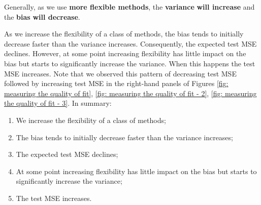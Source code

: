 \documentclass[a4paper]{article}
\newcommand{\definition}[1]{\textcolor{Red3}{\textbf{#1}}\index{#1}}
\newcommand{\highspace}{\vspace{1.2em}\noindent}
\begin{document}
    \noindent
    Generally, as we use \textbf{more flexible methods}, the \definition{variance} \textbf{will increase} and the \definition{bias} \textbf{will decrease}.

    \highspace
    As we increase the flexibility of a class of methods, the bias tends to initially decrease faster than the variance increases. Consequently, the expected test MSE declines. However, at some point increasing flexibility has little impact on the bias but starts to significantly increase the variance. When this happens the test MSE increases. Note that we observed this pattern of decreasing test MSE followed by increasing test MSE in the right-hand panels of Figures \ref{fig: measuring the quality of fit}, \ref{fig: measuring the quality of fit - 2}, \ref{fig: measuring the quality of fit - 3}. In summary:
    \begin{enumerate}
        \item We increase the flexibility of a class of methods;
        \item The bias tends to initially decrease faster than the variance increases;
        \item The expected test MSE declines;
        \item At some point increasing flexibility has little impact on the bias but starts to significantly increase the variance;
        \item The test MSE increases.
    \end{enumerate}

    \newpage
\end{document}
